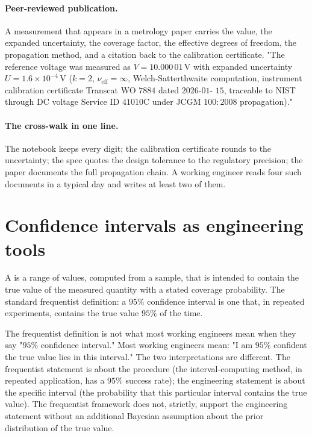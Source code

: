 \paragraph{Peer-reviewed publication.} A measurement that
appears in a metrology paper carries the value, the expanded
uncertainty, the coverage factor, the effective degrees of
freedom, the propagation method, and a citation back to the
calibration certificate. "The reference voltage was measured
as $V = 10.000\,01\,\si{\volt}$ with expanded uncertainty $U =
1.6 \times 10^{-4}\,\si{\volt}$ ($k = 2$, $\nu_{\text{eff}} =
\infty$, Welch-Satterthwaite computation, instrument
calibration certificate Transcat WO $7884$ dated $2026$-$01$-
$15$, traceable to NIST through DC voltage Service ID $41010$C
under JCGM $100{:}2008$ propagation)."

\paragraph{The cross-walk in one line.} The notebook keeps every
digit; the calibration certificate rounds to the uncertainty;
the spec quotes the design tolerance to the regulatory
precision; the paper documents the full propagation chain. A
working engineer reads four such documents in a typical day
and writes at least two of them.

\section{Confidence intervals as engineering tools}

A  is a range of values, computed from
a sample, that is intended to contain the true value of the
measured quantity with a stated coverage probability. The standard
frequentist definition: a $95\%$ confidence interval is one that,
in repeated experiments, contains the true value $95\%$ of the
time.

The frequentist definition is not what most working engineers mean
when they say "$95\%$ confidence interval." Most working engineers
mean: "I am $95\%$ confident the true value lies in this interval."
The two interpretations are different. The frequentist statement is
about the procedure (the interval-computing method, in repeated
application, has a $95\%$ success rate); the engineering statement
is about the specific interval (the probability that this
particular interval contains the true value). The frequentist
framework does not, strictly, support the engineering statement
without an additional Bayesian assumption about the prior
distribution of the true value.

